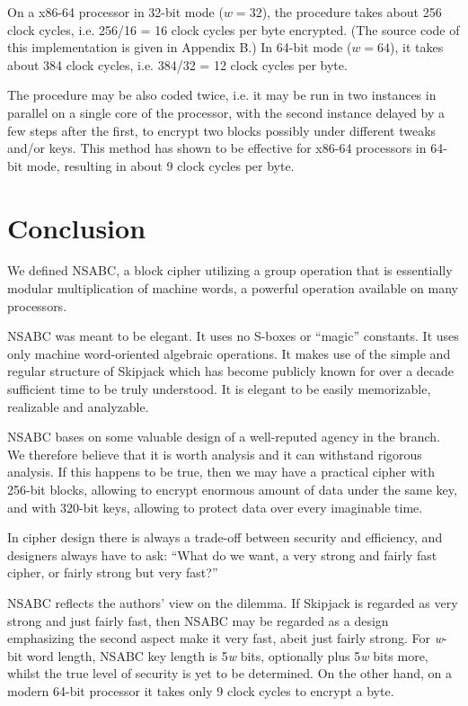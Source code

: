 \documentclass[a4paper,oneside,english]{amsart}
\numberwithin{equation}{section}
\numberwithin{figure}{section}
\begin{document}
On a x86-64 processor in 32-bit mode ($w=32$), the procedure takes
about 256 clock cycles, i.e. 256/16 = 16 clock cycles per byte encrypted.
(The source code of this implementation is given in Appendix B.) In
64-bit mode ($w=64$), it takes about 384 clock cycles, i.e. 384/32
= 12 clock cycles per byte.

The procedure may be also coded twice, i.e. it may be run in two instances
in parallel on a single core of the processor, with the second instance
delayed by a few steps after the first, to encrypt two blocks possibly
under different tweaks and/or keys. This method has shown to be effective
for x86-64 processors in 64-bit mode, resulting in about 9 clock cycles
per byte.


\section{Conclusion}

We defined NSABC, a block cipher utilizing a group operation that
is essentially modular multiplication of machine words, a powerful
operation available on many processors.

NSABC was meant to be elegant. It uses no S-boxes or {}``magic''
constants. It uses only machine word-oriented algebraic operations.
It makes use of the simple and regular structure of Skipjack which
has become publicly known for over a decade \textemdash{} sufficient
time to be truly understood. It is elegant to be easily memorizable,
realizable and analyzable.

NSABC bases on some valuable design of a well-reputed agency in the
branch. We therefore believe that it is worth analysis and it can
withstand rigorous analysis. If this happens to be true, then we may
have a practical cipher with 256-bit blocks, allowing to encrypt enormous
amount of data under the same key, and with 320-bit keys, allowing
to protect data over every imaginable time.

In cipher design there is always a trade-off between security and
efficiency, and designers always have to ask: {}``What do we want,
a very strong and fairly fast cipher, or fairly strong but very fast?'' 

NSABC reflects the authors' view on the dilemma. If Skipjack is regarded
as very strong and just fairly fast, then NSABC may be regarded as
a design emphasizing the second aspect \textemdash{} make it very
fast, abeit just fairly strong. For \emph{w}-bit word length, NSABC
key length is 5\emph{w} bits, optionally plus 5\emph{w} bits more,
whilst the true level of security is yet to be determined. On the
other hand, on a modern 64-bit processor it takes only 9 clock cycles
to encrypt a byte.
\end{document}
